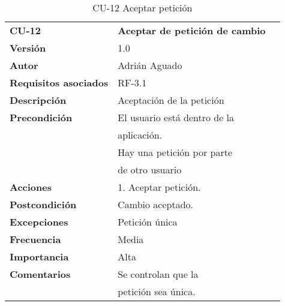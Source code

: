\begin{table}[H]
\begin{tabular}{llr}  
\toprule
\begin{minipage}[b]{0.24\columnwidth}\raggedright\strut
\textbf{CU-12}\strut
\end{minipage} & \begin{minipage}[b]{0.72\columnwidth}\raggedright\strut
\textbf{Aceptar de petición de cambio}\strut
\end{minipage}\tabularnewline
\cmidrule(r){1-2}
\textbf{Versión}       & 1.0           \\
\textbf{Autor}       & Adrián  Aguado    \\
\textbf{Requisitos asociados}       & RF-3.1 \\
\textbf{Descripción} & Aceptación de la petición\\
\textbf{Precondición}  & El usuario está dentro de la \\
& aplicación.      \\
& Hay una petición por parte \\
& de otro usuario \\
\textbf{Acciones} & 1. Aceptar petición. \\
\textbf{Postcondición} & Cambio aceptado. \\
\textbf{Excepciones} &   Petición única  \\
\textbf{Frecuencia} & Media          \\
\textbf{Importancia} & Alta            \\
\textbf{Comentarios } & Se controlan que la       \\
& petición sea única. \\
\bottomrule
\end{tabular}
\caption{CU-12 Aceptar petición} 
\end{table}

